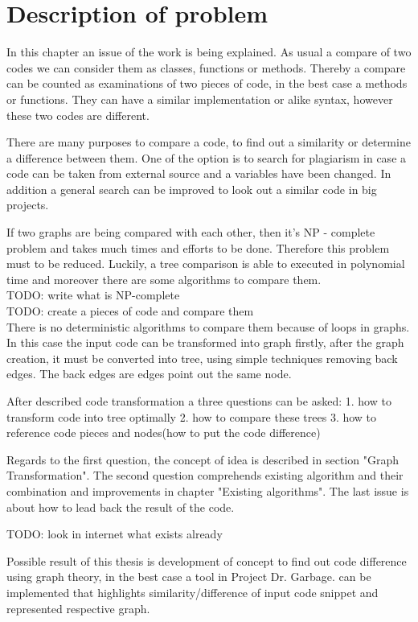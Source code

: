 \chapter{Description of problem}
\label{cha:Description}

In this chapter an issue of the work is being explained. As usual a compare of two codes we can consider them as classes, functions or methods. Thereby a compare can be counted as examinations of two pieces of code, in the best case a methods or functions. They can have a similar implementation or alike syntax, however these two codes are different.

There are many purposes to compare a code, to find out a similarity or determine a difference between them. One of the option is to search for plagiarism in case a code can be taken from external source and a variables have been changed. In addition a general search can be improved to look out a similar code in big projects.

If two graphs are being compared with each other, then it's NP - complete problem and takes much times and efforts to be done. Therefore this problem must to be reduced. Luckily, a tree comparison is able to executed in polynomial time and moreover there are some algorithms to compare them.
\\
TODO: write what is NP-complete \\
TODO: create a pieces of code and compare them
\\
There is no deterministic algorithms to compare them because of loops in graphs. In this case the input code can be transformed into graph firstly, after the graph creation, it must be converted into tree, using simple techniques removing back edges. The back edges are edges point out the same node. 

After described code transformation a three questions can be asked:
 1. how to transform code into tree optimally
 2. how to compare these trees
 3. how to reference code pieces and nodes(how to put the code difference) 

Regards to the first question, the concept of idea is described in section "Graph Transformation". The second question comprehends existing algorithm and their combination and improvements in chapter "Existing algorithms". The last issue is about how to lead back the result of the code.

TODO: look in internet what exists already 

Possible result of this thesis is development of concept to find out code difference using graph theory, in the best case a tool in Project Dr. Garbage\cite{drgarbage}. can be implemented that highlights similarity/difference of input code snippet and represented respective graph.

